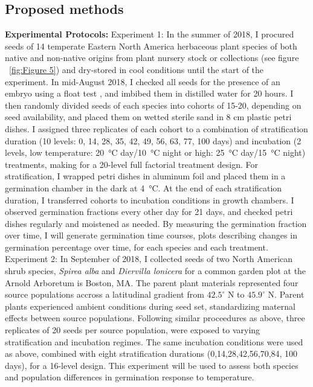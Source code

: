 \documentclass{article}\usepackage[]{graphicx}\usepackage[]{color}
\begin{document}
\subsection*{Proposed methods}
\indent\indent\textbf{Experimental Protocols:} Experiment 1: In the summer of 2018, I procured seeds of 14 temperate Eastern North America herbaceous plant species of both native and non-native origins from plant nursery stock or collections (see figure ~\ref{fig:Figure 5}) and dry-stored in cool conditions until the start of the experiment. In mid-August 2018, I checked all seeds for the presence of an embryo using a float test \citep{Baskin2014}, and imbibed them in distilled water for 20 hours. I then randomly divided seeds of each species into cohorts of 15-20, depending on seed availability, and placed them on wetted sterile sand in 8 cm plastic petri dishes. I assigned three replicates of each cohort to a combination of stratification duration (10 levels: 0, 14, 28, 35, 42, 49, 56, 63, 77, 100 days) and incubation (2 levels, low temperature: \SI{20}{\degreeCelsius} day/\SI{10}{\degreeCelsius} night or high: \SI{25}{\degreeCelsius} day/\SI{15}{\degreeCelsius} night) treatments, making for a 20-level full factorial treatment design. For stratification, I wrapped petri dishes in aluminum foil and placed them in a germination chamber in the dark at \SI{4}{\degreeCelsius}. At the end of each stratification duration, I transferred cohorts to incubation conditions in growth chambers. I observed germination fractions every other day for 21 days, and checked petri dishes regularly and moistened as needed. By measuring the germination fraction over time, I will generate germination time courses, plots describing changes in germination percentage over time, for each species and each treatment.\\
\indent Experiment 2: In September of 2018, I collected seeds of two North American shrub species, \textit{Spirea alba} and \textit{Diervilla lonicera} for a common garden plot at the Arnold Arboretum is Boston, MA. The parent plant materials represented four source populations accross a latitudinal gradient from $42.5^\circ$ N to $45.9^\circ$ N. Parent plants experienced ambient conditions during seed set, standardizing maternal effects between source populations. Following similar proceedures as above, three replicates of 20 seeds per source population, were exposed to varying stratification and incubation regimes. The same incubation conditions were used as above, combined with eight stratification durations (0,14,28,42,56,70,84, 100 days), for a 16-level design. This experiment will be used to assess both species and population differences in germination response to temperature.\\
\end{document}
